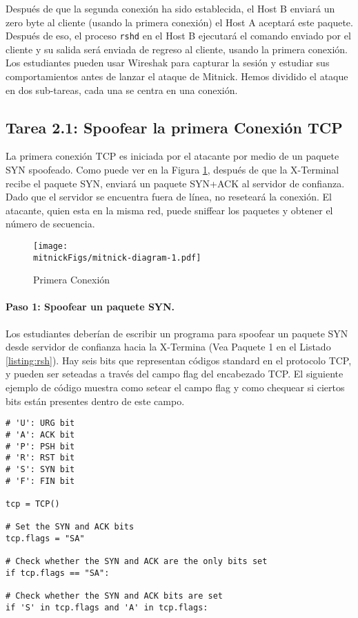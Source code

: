 Después de que la segunda conexión ha sido establecida, el Host B enviará un zero byte al cliente (usando la primera conexión) el Host A aceptará este paquete. Después de eso, el proceso  \texttt{rshd} en el Host B ejecutará el comando enviado por el cliente y su salida será enviada de regreso al cliente, usando la primera conexión.
Los estudiantes pueden usar Wireshak para capturar la sesión \rsh y estudiar sus comportamientos antes de lanzar el ataque de Mitnick.
Hemos dividido el ataque en dos sub-tareas, cada una se centra en una conexión.



\subsection{Tarea 2.1: Spoofear la primera Conexión TCP}
\label{sec:first-conn}

La primera conexión TCP es iniciada por el atacante por medio de un paquete SYN spoofeado. Como puede ver en la Figura \ref{fig:first-conn}, después de que la X-Terminal recibe el paquete SYN, enviará un paquete SYN+ACK  al servidor de confianza. Dado que el servidor se encuentra fuera de línea, no reseteará la conexión. El atacante, quien esta en la misma red, puede sniffear los paquetes y obtener el número de secuencia.

\begin{figure}[htb]
\centering
\texttt{[image: \\mitnickFigs/mitnick-diagram-1.pdf]}
\caption{Primera Conexión}
\label{fig:first-conn}
\end{figure}


\paragraph{Paso 1: Spoofear un paquete SYN.}
Los estudiantes deberían de escribir un programa para spoofear un paquete SYN desde servidor de confianza hacia la X-Termina (Vea Paquete 1 en el Listado \ref{listing:rsh}). 
Hay seis bits que representan códigos standard en el protocolo TCP, y pueden ser seteadas a través del campo flag del encabezado TCP.
El siguiente ejemplo de código muestra como setear el campo flag y como chequear si ciertos bits están presentes dentro de este campo.

\begin{lstlisting}
# 'U': URG bit
# 'A': ACK bit
# 'P': PSH bit
# 'R': RST bit
# 'S': SYN bit
# 'F': FIN bit

tcp = TCP()

# Set the SYN and ACK bits
tcp.flags = "SA"

# Check whether the SYN and ACK are the only bits set
if tcp.flags == "SA": 

# Check whether the SYN and ACK bits are set
if 'S' in tcp.flags and 'A' in tcp.flags: 
\end{lstlisting}

